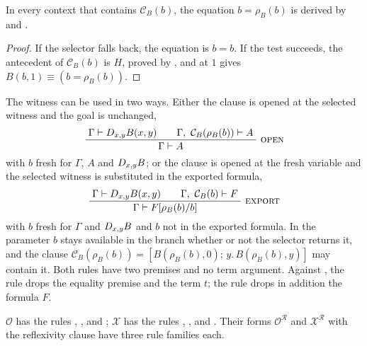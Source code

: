 \begin{lemma}
\label{disch:lem:selected}
In every context that contains $\mathcal C_B(b)$, the equation
$b=\rho_B(b)$ is derived by  and .
\end{lemma}

\begin{proof}
If the selector falls back, the equation is $b=b$. If the test succeeds,
the antecedent of $\mathcal C_B(b)$ is $H$, proved by , and
 at $1$ gives $B(b,1)\equiv(b=\rho_B(b))$.
\end{proof}

The witness can be used in two ways. Either the clause is opened at the
selected witness and the goal is unchanged,
\begin{equation}
 \infrule{\Gamma\proves\D{x}{y}B(x,y)\qquad
          \Gamma,\ \mathcal C_B(\rho_B(b))\proves A}
         {\Gamma\proves A}\ \rulename{Open}
 \label{disch:eq:open}
\end{equation}
with $b$ fresh for $\Gamma$, $A$ and $D_{x,y}B$; or the clause is opened
at the fresh variable and the selected witness is substituted in the
exported formula,
\begin{equation}
 \infrule{\Gamma\proves\D{x}{y}B(x,y)\qquad
          \Gamma,\ \mathcal C_B(b)\proves F}
         {\Gamma\proves F\subst{\rho_B(b)}{b}}\ \rulename{Export}
 \label{disch:eq:export}
\end{equation}
with $b$ fresh for $\Gamma$ and $D_{x,y}B$ and $b$ not in the exported
formula. In  the parameter $b$ stays available in the
branch whether or not the selector returns it, and the clause
$\mathcal C_B(\rho_B(b))=[B(\rho_B(b),0);\,y.\,B(\rho_B(b),y)]$ may contain
it. Both rules have two premises and no term argument. Against
, the rule  drops the equality premise and
the term $t$; the rule  drops in addition the formula $F$.

\begin{definition}
\label{disch:def:inferred}
$\mathcal O$ has the rules , ,
 and ; $\mathcal X$ has the rules
, ,  and .
Their forms $\mathcal O^{\mathcal R}$ and $\mathcal X^{\mathcal R}$ with
the reflexivity clause have three rule families each.
\end{definition}

